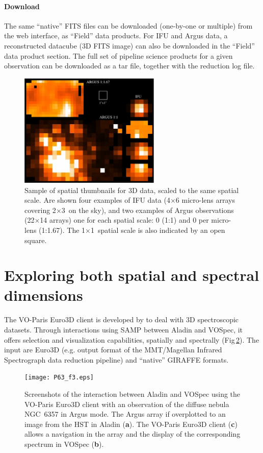 \documentclass[11pt,twoside]{article}
\begin{document}
\paragraph{Download} The same ``native'' FITS files can be downloaded (one-by-one or multiple) from the web interface, as ``Field'' data products. For IFU and Argus data, a reconstructed datacube (3D FITS image) can also be downloaded in the ``Field''  data product section. The full set of pipeline science products for a given observation can be downloaded as a tar file, together with the reduction log file. 

\begin{figure}[!ht]
\begin{center}
    \includegraphics[width=0.6\textwidth]{P63_f2.eps}
\end{center}
\caption{Sample of spatial thumbnails for 3D data, scaled to the same spatial scale. Are shown four examples of IFU data (4$\times$6 micro-lens arrays covering 2\arcsec$\times$3\arcsec\ on the sky), and two examples of Argus observations (22$\times$14 arrays) one for each spatial scale:  0 (1:1) and 0 per micro-lens (1:1.67). The 1\arcsec$\times$1\arcsec\ spatial scale is also indicated by an open square.}
\label{thumbnails}
\end{figure}

\section{Exploring both spatial and spectral dimensions}
The VO-Paris Euro3D client is developed by \citet{Chn_08} to deal with 3D spectroscopic datasets. Through interactions using SAMP between Aladin and VOSpec, it offers selection and visualization capabilities, spatially and spectrally (Fig\,\ref{aladin}). The input are Euro3D (e.g.  output format of the MMT/Magellan Infrared Spectrograph data reduction pipeline) and ``native'' GIRAFFE formats. 
\begin{figure}[!ht]
\begin{center}
    \texttt{[image: P63\_f3.eps]}
\end{center}
\caption{Screenshots of the interaction between Aladin and VOSpec using the VO-Paris Euro3D client \citep{Chn_08} with an observation of the diffuse nebula NGC~6357 in Argus mode. The Argus array if overplotted to an image from the HST in Aladin (\textbf{a}). The VO-Paris Euro3D client (\textbf{c}) allows a navigation in the array and the display of the corresponding spectrum in VOSpec (\textbf{b}).}
\label{aladin}
\end{figure}





\end{document}
